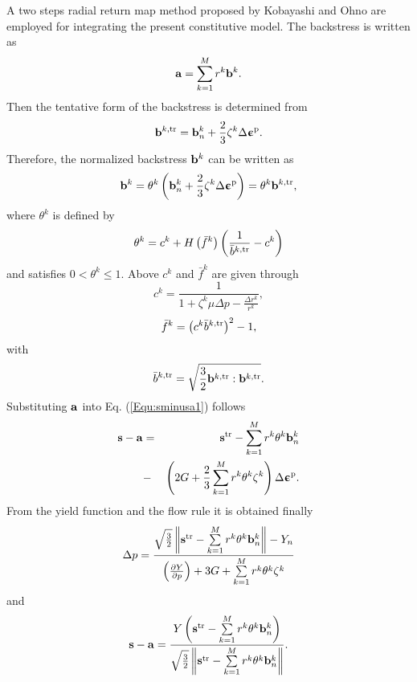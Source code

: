 \documentclass[preprint,5p,twocolumn,11pt,sort&compress]{elsarticle}
\newcommand{\bfepsilon}{{\bm{\upepsilon}}}
\newcommand{\bfa}{{\bf a}}
\newcommand{\bfb}{{\bf b}}
\newcommand{\bfs}{{\bf s}}
\begin{document}
A two steps radial return map method proposed by  Kobayashi and Ohno \cite{kobayashi2002implementation} are employed for integrating the present constitutive model. The backstress is written as
\begin{equation}
{\bfa} = \sum\limits_{k = 1}^M {r^k\bfb^k}.
\end{equation}
Then the tentative form of the backstress is determined from
\begin{equation}
\label{Equ:btrn+1}
\bfb^{k,\rm{tr}} = \bfb_n^k + \frac{2}{3}{\zeta ^k}\Delta \bfepsilon^{\rm p}.
\end{equation}
Therefore, the normalized backstress $\bfb^k$ can be written as
\begin{equation}
\label{Equ:bn+1}
\bfb^k = \theta ^k\left( {\bfb_n^k + \frac{2}{3}{\zeta ^k}\Delta \bfepsilon^{\rm p}} \right) = \theta ^k\bfb^{k,\rm{tr}},
\end{equation}
where $\theta ^k$ is defined by
\begin{equation}
\label{Equ:thetan+1}
\theta ^k = c^k + H\left( {\bar f^k} \right)\left( {\frac{1}{{\bar b^{k,\rm{tr}}}} - c^k} \right)
\end{equation}
 and satisfies $0 < \theta ^k \leqslant 1$. Above $c^k$ and ${\bar f^k}$ are given through
\[
c^k = \frac{1}{{1 + {\zeta ^k}\mu \Delta {p} - \frac{{\Delta r^k}}{{r^k}}}},
\]
\[
\bar f^k = {\left( {c^k\bar b^{k,\rm{tr}}} \right)^2} - 1,
\]
with
\[
\bar b^{k,\rm{tr}} = \sqrt {\frac{3}{2}\bfb^{k,\rm{tr}}:\bfb^{k,\rm{tr}}}.
\]
Substituting ${\bfa}$ into Eq. (\ref{Equ:sminusa1}) follows
\begin{eqnarray}
\label{Equ:sminusa2}
{{\bfs} - {\bfa}}&=&
\bfs^{\rm tr} - \sum\limits_{k = 1}^M {r^k\theta ^k\bfb_n^k}
\\ \nonumber
&-& \left( {2G + \frac{2}{3}\sum\limits_{k = 1}^M {r^k\theta ^k{\zeta ^k}} } \right)\Delta \bfepsilon^{\rm p}.
\end{eqnarray}
From the yield function and the flow rule it is obtained finally
\begin{equation}
\Delta {p} = \frac{{\sqrt {\frac{3}{2}} \left\| {\bfs^{\rm tr} - \sum\limits_{k = 1}^M {r^k\theta ^k\bfb_n^k} } \right\| - {Y_n}}}{{{{\left( {\frac{{\partial Y}}{{\partial p}}} \right)}} + 3G + \sum\limits_{k = 1}^M {r^k\theta ^k{\zeta ^k}} }}
\end{equation}
and
\begin{equation}
{\bfs} - {\bfa} = \frac{{{Y}\left( {\bfs^{\rm tr} - \sum\limits_{k = 1}^M {r^k\theta ^k\bfb_n^k} } \right)}}{{\sqrt {\frac{3}{2}} \left\| {\bfs^{\rm tr} - \sum\limits_{k = 1}^M {r^k\theta ^k\bfb_n^k} } \right\|}}.
\end{equation}
\end{document}
